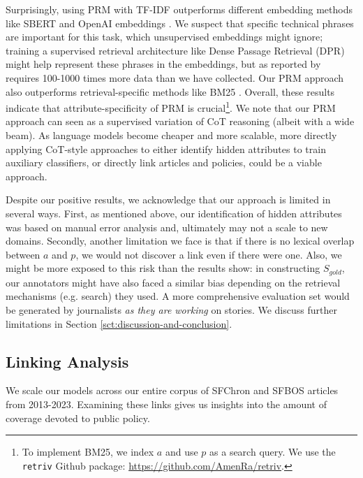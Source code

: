 \documentclass[11pt]{article}
\begin{document}
Surprisingly, using PRM with TF-IDF outperforms different embedding methods like SBERT \cite{reimers2019sentence} and OpenAI embeddings \cite{openaiembeddings}. We suspect that specific technical phrases are important for this task, which unsupervised embeddings might ignore; training a supervised retrieval architecture like Dense Passage Retrieval (DPR) might help represent these phrases in the embeddings, but as reported by  requires 100-1000 times more data than we have collected. 
Our PRM approach also outperforms retrieval-specific methods like BM25 \cite{robertson2009probabilistic}. Overall, these results indicate that attribute-specificity of PRM is crucial\footnote{To implement BM25, we index $a$ and use $p$ as a search query. We use the \texttt{retriv} Github package: \url{https://github.com/AmenRa/retriv}.}. We note that our PRM approach can seen as a supervised variation of CoT reasoning \cite{wei2022chain} (albeit with a wide beam). As language models become cheaper and more scalable, more directly applying CoT-style approaches to either identify hidden attributes to train auxiliary classifiers, or directly link articles and policies, could be a viable approach. 

Despite our positive results, we acknowledge that our approach is limited in several ways. First, as mentioned above, our identification of hidden attributes was based on manual error analysis and, ultimately may not a scale to new domains. Secondly, another limitation we face is that if there is no lexical overlap between $a$ and $p$, we would not discover a link even if there were one. Also, we might be more exposed to this risk than the results show: in constructing $S_{gold}$, our annotators might have also faced a similar bias depending on the retrieval mechanisms (e.g. search) they used. A more comprehensive evaluation set would be generated by journalists \textit{as they are working} on stories. We discuss further limitations in Section \ref{sct:discussion-and-conclusion}.

\subsection{Linking Analysis}
\label{sct:sct-1:analysis}
We scale our models across our entire corpus of SFChron and SFBOS articles from 2013-2023. Examining these links gives us insights into the amount of coverage devoted to public policy.
\end{document}
